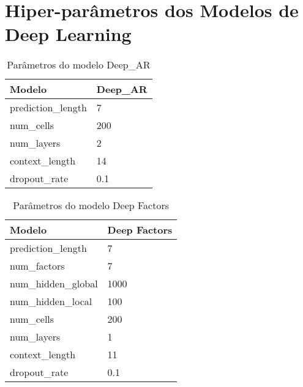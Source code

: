 \pagestyle{appendix}


\section{Hiper-parâmetros dos Modelos de Deep Learning}
\label{ap:modelos}



\begin{center}
\begin{table}[]
\begin{tabular}{|l|l|}
\hline
Modelo             & Deep\_AR \\ \hline
prediction\_length & 7        \\ \hline
num\_cells         & 200      \\ \hline
num\_layers        & 2        \\ \hline
context\_length    & 14       \\ \hline
dropout\_rate      & 0.1      \\ \hline
\end{tabular}
\caption{Parâmetros do modelo Deep_AR}
\end{table}
\end{center}

\begin{center}
\begin{table}[]
\begin{tabular}{|l|l|}
\hline
Modelo             & Deep Factors \\ \hline
prediction\_length & 7        \\ \hline
num\_factors & 7        \\ \hline
num\_hidden\_global & 1000        \\ \hline
num\_hidden\_local & 100        \\ \hline
num\_cells         & 200      \\ \hline
num\_layers        & 1        \\ \hline
context\_length    & 11       \\ \hline
dropout\_rate      & 0.1      \\ \hline
\end{tabular}
\caption{Parâmetros do modelo Deep Factors}
\end{table}
\end{center}


